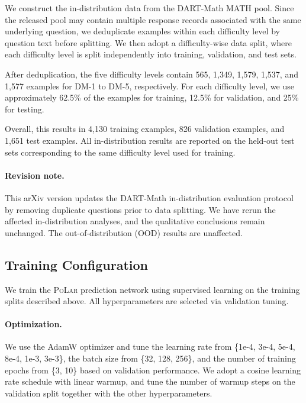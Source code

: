 \documentclass{article}
\theoremstyle{plain}
\theoremstyle{definition}
\theoremstyle{remark}
\newcommand\ours{\textsc{PoLar}\xspace}
\begin{document}
We construct the in-distribution data from the DART-Math MATH pool. Since the released pool may contain multiple response records associated with the same underlying question, we deduplicate examples within each difficulty level by question text before splitting. We then adopt a difficulty-wise data split, where each difficulty level is split independently into training, validation, and test sets.

After deduplication, the five difficulty levels contain 565, 1,349, 1,579, 1,537, and 1,577 examples for DM-1 to DM-5, respectively. For each difficulty level, we use approximately 62.5\% of the examples for training, 12.5\% for validation, and 25\% for testing.

Overall, this results in 4,130 training examples, 826 validation examples, and 1,651 test examples. All in-distribution results are reported on the held-out test sets corresponding to the same difficulty level used for training.

\paragraph{Revision note.}
This arXiv version updates the DART-Math in-distribution evaluation protocol by removing duplicate questions prior to data splitting. We have rerun the affected in-distribution analyses, and the qualitative conclusions remain unchanged. The out-of-distribution (OOD) results are unaffected.

\subsection{Training Configuration}
We train the \ours prediction network using supervised learning on the training splits described above. 
All hyperparameters are selected via validation tuning.

\paragraph{Optimization.}
We use the AdamW optimizer and tune the learning rate from 
\{1e-4, 3e-4, 5e-4, 8e-4, 1e-3, 3e-3\}, 
the batch size from \{32, 128, 256\}, 
and the number of training epochs from \{3, 10\}
based on validation performance.
We adopt a cosine learning rate schedule with linear warmup, and tune the number of warmup steps on the validation split together with the other hyperparameters.
\end{document}
